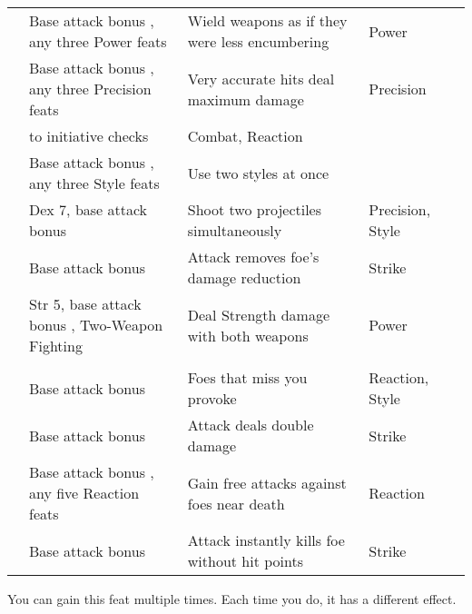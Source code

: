 {\begin{longtabu}{>{\lcol}p{10em} >{\lcol}p{15em} >{\lcol}X >{\lcol}p{6em} >{\lcol}p{3em}}
         & Base attack bonus , any three Power feats & Wield weapons as if they were less encumbering & Power&  \\
         & Base attack bonus , any three Precision feats & Very accurate hits deal maximum damage & Precision &  \\
         &  to initiative checks & Combat, Reaction &  \\
         & Base attack bonus , any three Style feats & Use two styles at once & \x &  \\
         & Dex 7, base attack bonus  & Shoot two projectiles simultaneously & Precision, Style &  \\
         & Base attack bonus  & Attack removes foe's damage reduction & Strike &  \\
         & Str 5, base attack bonus , Two-Weapon Fighting & Deal Strength damage with both weapons & Power &  \\

        \midrule
         &  &  &  &  \\
         & Base attack bonus  & Foes that miss you provoke & Reaction, Style&  \\
         & Base attack bonus  & Attack deals double damage & Strike &  \\
         & Base attack bonus , any five Reaction feats & Gain free attacks against foes near death & Reaction &  \\
         & Base attack bonus  & Attack instantly kills foe without hit points & Strike &  \\
    \end{longtabu}
    \begin{enumerate*}
        \item You can gain this feat multiple times. Each time you do, it has a different effect.
    \end{enumerate*}
}%

